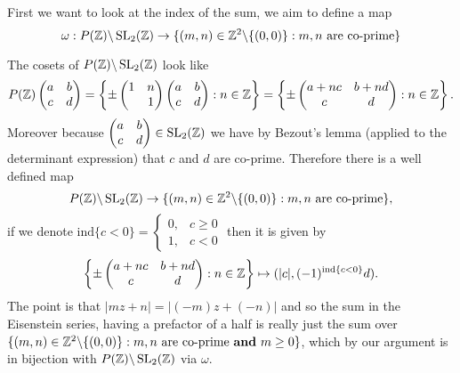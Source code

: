 First we want to look at the index of the sum, we aim to define a map
	\[\omega: P(\Z) \backslash \SL_2(\Z) \to  \{(m,n)\in \Z^2\backslash\{(0,0)\} : m,n \text{ are co-prime}\}\]

	The cosets of \(P(\Z) \backslash \SL_2(\Z)\) look like
	\[P(\Z)\begin{pmatrix}
		a & b \\ c& d
	\end{pmatrix} = \left\{\pm\begin{pmatrix}
		1 & n \\&1
	\end{pmatrix}\begin{pmatrix}
	a & b \\ c& d
	\end{pmatrix} : n\in \Z\right\} = \left\{\pm\begin{pmatrix}
	a+nc & b+nd \\ c & d
	\end{pmatrix} : n\in \Z\right\}.\]
	Moreover because \(\begin{pmatrix}
		a & b \\ c& d
	\end{pmatrix}\in \SL_2(\Z)\) we have by Bezout's lemma (applied to the determinant expression) that \(c\) and \(d\) are co-prime. Therefore there is a well defined map 
	\[P(\Z) \backslash \SL_2(\Z) \to  \{(m,n)\in \Z^2\backslash\{(0,0)\} : m,n \text{ are co-prime}\},\]
	if we denote \(\mathrm{ind}\{c<0\} = \begin{cases}
		0, & c\geq 0\\
		1, & c<0
	\end{cases}\) then it is given by 
	\[\left\{\pm\begin{pmatrix}
		a+nc & b+nd \\ c & d
	\end{pmatrix} : n\in \Z\right\}\mapsto (|c|,(-1)^{\mathrm{ind}\{c<0\}}d).\]
	The point is that \(|mz + n| = |(-m)z + (-n)|\) and so the sum in the Eisenstein series, having a prefactor of a half is really just the sum over \( \{(m,n)\in \Z^2\backslash\{(0,0)\} : m,n \text{ are co-prime \textbf{and} }m\geq 0\}\), which by our argument is in bijection with \(P(\Z) \backslash \SL_2(\Z)\) via \(\omega\).
	

	

